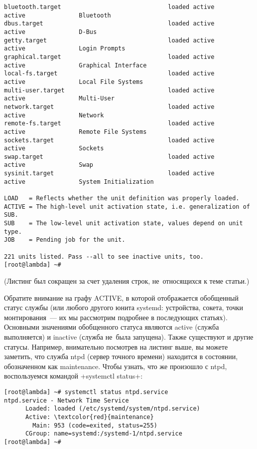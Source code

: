 \documentclass[10pt,oneside,a4paper]{article}
\begin{document}
\begin{landscape}
\begin{Verbatim}[fontsize=\small]
bluetooth.target                              loaded active       active               Bluetooth
dbus.target                                   loaded active       active               D-Bus
getty.target                                  loaded active       active               Login Prompts
graphical.target                              loaded active       active               Graphical Interface
local-fs.target                               loaded active       active               Local File Systems
multi-user.target                             loaded active       active               Multi-User
network.target                                loaded active       active               Network
remote-fs.target                              loaded active       active               Remote File Systems
sockets.target                                loaded active       active               Sockets
swap.target                                   loaded active       active               Swap
sysinit.target                                loaded active       active               System Initialization

LOAD   = Reflects whether the unit definition was properly loaded.
ACTIVE = The high-level unit activation state, i.e. generalization of SUB.
SUB    = The low-level unit activation state, values depend on unit type.
JOB    = Pending job for the unit.

221 units listed. Pass --all to see inactive units, too.
[root@lambda] ~#
\end{Verbatim}
(Листинг был сокращен за счет удаления строк, не~относящихся к теме статьи.)
\end{landscape}

Обратите внимание на графу ACTIVE, в которой отображается обобщенный статус
службы (или любого другого юнита systemd: устройства, сокета, точки
монтирования~--- их мы рассмотрим подробнее в последующих статьях). Основными
значениями обобщенного статуса являются active (служба выполняется) и inactive
(служба не~была запущена). Также существуют и другие статусы. Например,
внимательно посмотрев на листинг выше, вы можете заметить, что служба ntpd
(сервер точного времени) находится в состоянии, обозначенном как maintenance.
Чтобы узнать, что же произошло с ntpd, воспользуемся командой
+systemctl status+: 
\begin{Verbatim}[commandchars=\\\{\}]
[root@lambda] ~# systemctl status ntpd.service
ntpd.service - Network Time Service
	  Loaded: loaded (/etc/systemd/system/ntpd.service)
	  Active: \textcolor{red}{maintenance}
	    Main: 953 (code=exited, status=255)
	  CGroup: name=systemd:/systemd-1/ntpd.service
[root@lambda] ~#
\end{Verbatim}
\end{document}
